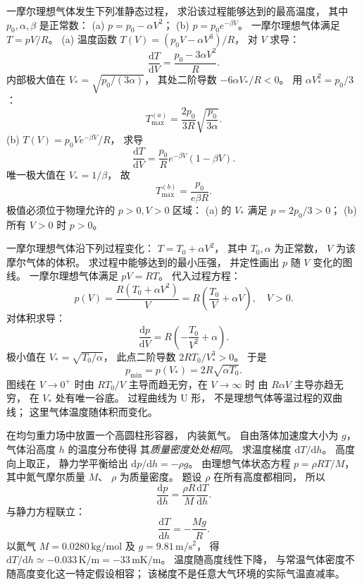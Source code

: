 一摩尔理想气体发生下列准静态过程，
求沿该过程能够达到的最高温度，
其中 $p_0,\alpha,\beta$ 是正常数：
(a) $p=p_0-\alpha V^2$；
(b) $p=p_0e^{-\beta V}$。
\exsolution
一摩尔理想气体满足
$T=pV/R$。
(a) 温度函数
$T(V)=(p_0V-\alpha V^3)/R$，
对 $V$ 求导：
\[
\frac{\mathrm dT}{\mathrm dV}
=\frac{p_0-3\alpha V^2}{R}.
\]
内部极大值在
$V_*=\sqrt{p_0/(3\alpha)}$，
其处二阶导数
$-6\alpha V_*/R<0$。
用
$\alpha V_*^2=p_0/3$：
\[
\boxed{T_{\max}^{(a)}
=\frac{2p_0}{3R}
\sqrt{\frac{p_0}{3\alpha}}}.
\]
(b) $T(V)=p_0Ve^{-\beta V}/R$，
求导
\[
\frac{\mathrm dT}{\mathrm dV}
=\frac{p_0}{R}e^{-\beta V}(1-\beta V).
\]
唯一极大值在 $V_*=1/\beta$，
故
\[
\boxed{T_{\max}^{(b)}
=\frac{p_0}{e\beta R}}.
\]
\excheck 极值必须位于物理允许的
$p>0,V>0$ 区域：
(a) 的 $V_*$ 满足 $p=2p_0/3>0$；
(b) 所有 $V>0$ 时 $p>0$。

一摩尔理想气体沿下列过程变化：
$T=T_0+\alpha V^2$，
其中 $T_0,\alpha$ 为正常数，
$V$ 为该摩尔气体的体积。
求过程中能够达到的最小压强，
并定性画出 $p$ 随 $V$ 变化的图线。
\exsolution
一摩尔理想气体满足 $pV=RT$。
代入过程方程：
\[
p(V)=\frac{R(T_0+\alpha V^2)}{V}
=R\left(\frac{T_0}{V}+\alpha V\right),
\quad V>0.
\]
对体积求导：
\[
\frac{\mathrm dp}{\mathrm dV}
=R\left(-\frac{T_0}{V^2}+\alpha\right).
\]
极小值在
$V_*=\sqrt{T_0/\alpha}$，
此点二阶导数
$2RT_0/V_*^3>0$。
于是
\[
\boxed{p_{\min}=p(V_*)
=2R\sqrt{\alpha T_0}}.
\]
图线在 $V\to0^+$ 时由 $RT_0/V$
主导而趋无穷，在 $V\to\infty$ 时
由 $R\alpha V$ 主导亦趋无穷，
在 $V_*$ 处有唯一谷底。
\excheck 过程曲线为 U 形，
不是理想气体等温过程的双曲线；
这里气体温度随体积而变化。

在均匀重力场中放置一个高圆柱形容器，
内装氮气。
自由落体加速度大小为 $g$，
气体沿高度 $h$ 的温度分布使得
其\emph{质量密度处处相同}。
求温度梯度 $\mathrm dT/\mathrm dh$。
\exsolution
高度向上取正，
静力学平衡给出
$\mathrm dp/\mathrm dh=-\rho g$。
由理想气体状态方程
$p=\rho RT/M$，
其中氮气摩尔质量 $M$、
$\rho$ 为质量密度。
题设 $\rho$ 在所有高度都相同，
所以
\[
\frac{\mathrm dp}{\mathrm dh}
=\frac{\rho R}{M}\frac{\mathrm dT}{\mathrm dh}.
\]
与静力方程联立：
\[
\boxed{\frac{\mathrm dT}{\mathrm dh}
=-\frac{Mg}{R}}.
\]
以氮气 $M=0.0280\,\mathrm{kg/mol}$
及 $g=9.81\,\mathrm{m/s^2}$，
得
$\boxed{\mathrm dT/\mathrm dh
\simeq-0.033\,\mathrm{K/m}=-33\,\mathrm{mK/m}}$。
\excheck 温度随高度线性下降，
与常温气体密度不随高度变化这一特定假设相容；
该梯度不是任意大气环境的实际气温直减率。

